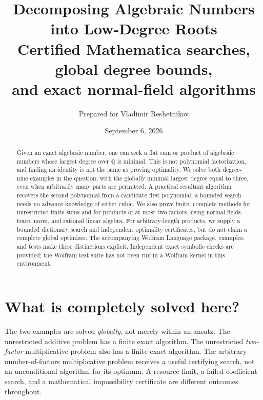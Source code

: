 \documentclass[11pt,a4paper]{article}
\title{\textbf{Decomposing Algebraic Numbers\\into Low-Degree Roots}\\[0.6em]
\large Certified Mathematica searches, global degree bounds,\\
and exact normal-field algorithms}
\author{Prepared for Vladimir Reshetnikov}
\date{September 6, 2026}
\theoremstyle{definition}\newtheorem{definition}[theorem]{Definition}
\theoremstyle{remark}\newtheorem{remark}[theorem]{Remark}
\newcommand{\Q}{\mathbb{Q}}\newcommand{\C}{\mathbb{C}}
\begin{document}
\maketitle
\begin{abstract}
Given an exact algebraic number, one can seek a flat sum or product of algebraic numbers whose largest degree over $\Q$ is minimal. This is not polynomial factorization, and finding an identity is not the same as proving optimality. We solve both degree-nine examples in the question, with the globally minimal largest degree equal to three, even when arbitrarily many parts are permitted. A practical resultant algorithm recovers the second polynomial from a candidate first polynomial; a bounded search needs no advance knowledge of either cubic. We also prove finite, complete methods for unrestricted finite sums and for products of at most two factors, using normal fields, trace, norm, and rational linear algebra. For arbitrary-length products, we supply a bounded dictionary search and independent optimality certificates, but do not claim a complete global optimizer. The accompanying Wolfram Language package, examples, and tests make these distinctions explicit. Independent exact symbolic checks are provided; the Wolfram test suite has not been run in a Wolfram kernel in this environment.
\end{abstract}

\section*{What is completely solved here?}
The two examples are solved \emph{globally}, not merely within an ansatz. The unrestricted additive problem has a finite exact algorithm. The unrestricted \emph{two-factor} multiplicative problem also has a finite exact algorithm. The arbitrary-number-of-factors multiplicative problem receives a useful certifying search, not an unconditional algorithm for its optimum. A resource limit, a failed coefficient search, and a mathematical impossibility certificate are different outcomes throughout.

\newpage
{\small\tableofcontents}
\newpage
\end{document}
